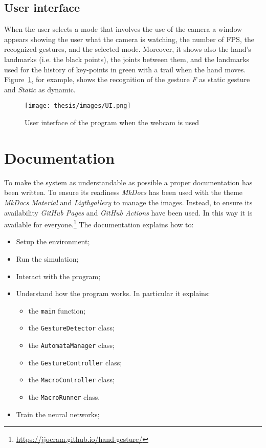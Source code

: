 \documentclass[../thesis.tex]{subfiles}
\begin{document}
\subsection{User interface}
When the user selects a mode that involves the use of the camera a window appears showing the user what the camera is watching, the number of FPS, the recognized gestures, and the selected mode. Moreover, it shows also the hand's landmarks (i.e. the black points), the joints between them, and the landmarks used for the history of key-points in green with a trail when the hand moves. Figure~\ref{fig:example_ui}, for example, shows the recognition of the gesture \textit{F} as static gesture and \textit{Static} as dynamic.

\begin{figure}
    \centering
    \texttt{[image: thesis/images/UI.png]}
    \caption{User interface of the program when the webcam is used}
    \label{fig:example_ui}
\end{figure}

\section{Documentation}
To make the system as understandable as possible a proper documentation has been written. To ensure its readiness \textit{MkDocs} has been used with the theme \textit{MkDocs Material} and \textit{Ligthgallery} to manage the images. Instead, to ensure its availability \textit{GitHub Pages} and \textit{GitHub Actions} have been used. In this way it is available for everyone.\footnote{\href{https://jjocram.github.io/hand-gesture/}{https://jjocram.github.io/hand-gesture/}} The documentation explains how to:
\begin{itemize}
    \item Setup the environment;
    \item Run the simulation;
    \item Interact with the program;
    \item Understand how the program works. In particular it explains:
    \begin{itemize}
        \item the \texttt{main} function;
        \item the \texttt{GestureDetector} class;
        \item the \texttt{AutomataManager} class;
        \item the \texttt{GestureController} class;
        \item the \texttt{MacroController} class;
        \item the \texttt{MacroRunner} class.
    \end{itemize}
    \item Train the neural networks;
\end{itemize}
\end{document}

